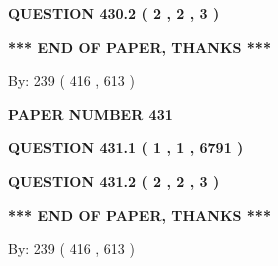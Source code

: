 \documentclass[12pt]{article}
\begin{document}
{\textbf{\Large{QUESTION
430.2 
 ( 2 , 2 , 3 )
}}}
  
  
   
   
 \vspace{0.2in}
 
   
   
   
   
\vspace{1.0in} 
{\textbf{\large{ *** END OF PAPER, THANKS *** }}} 
   
   
\hspace{1.0in} By: 
 239 ( 416 ,  613 )
   
   
   
   
\newpage 
\setcounter{page}{ 
   431001 } 
   
   
   
   
 {\textbf{ \Large{ PAPER NUMBER  431  }}}
   
   
\vspace{0.2in}
   
   
   
   
   
   
 \vspace{0.2in}
 
 
 
 
   
   
  
\vspace{0.2in}
  
{\textbf{\Large{QUESTION
431.1 
 ( 1 , 1 , 6791 )
}}}
  
  
  
\vspace{0.2in}
  
{\textbf{\Large{QUESTION
431.2 
 ( 2 , 2 , 3 )
}}}
  
  
   
   
 \vspace{0.2in}
 
   
   
   
   
\vspace{1.0in} 
{\textbf{\large{ *** END OF PAPER, THANKS *** }}} 
   
   
\hspace{1.0in} By: 
 239 ( 416 ,  613 )
   
   
   
   
\newpage 
\setcounter{page}{ 
   432001 } 
   
   
   
\end{document}
